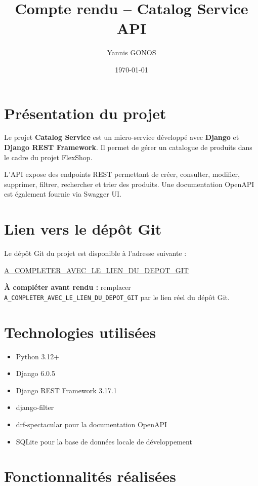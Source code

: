 \documentclass[12pt,a4paper]{article}
\title{Compte rendu -- Catalog Service API}
\author{Yannis GONOS}
\date{\today}
\begin{document}
\maketitle

\tableofcontents
\newpage

\section{Présentation du projet}

Le projet \textbf{Catalog Service} est un micro-service développé avec \textbf{Django} et \textbf{Django REST Framework}. Il permet de gérer un catalogue de produits dans le cadre du projet FlexShop.

L'API expose des endpoints REST permettant de créer, consulter, modifier, supprimer, filtrer, rechercher et trier des produits. Une documentation OpenAPI est également fournie via Swagger UI.

\section{Lien vers le dépôt Git}

Le dépôt Git du projet est disponible à l'adresse suivante :

\begin{center}
\url{A_COMPLETER_AVEC_LE_LIEN_DU_DEPOT_GIT}
\end{center}

\textbf{À compléter avant rendu :} remplacer \texttt{A\_COMPLETER\_AVEC\_LE\_LIEN\_DU\_DEPOT\_GIT} par le lien réel du dépôt Git.

\section{Technologies utilisées}

\begin{itemize}
    \item Python 3.12+
    \item Django 6.0.5
    \item Django REST Framework 3.17.1
    \item django-filter
    \item drf-spectacular pour la documentation OpenAPI
    \item SQLite pour la base de données locale de développement
\end{itemize}

\section{Fonctionnalités réalisées}
\end{document}

